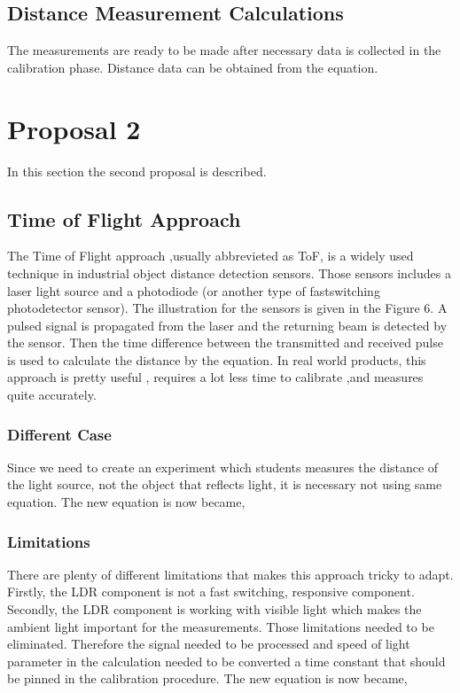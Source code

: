 \documentclass[letterpaper,12pt]{article}
\begin{document}
\subsection{Distance Measurement Calculations}
The measurements are ready to be made after necessary data is collected in the calibration phase. Distance data can be obtained from the  equation.



\section{Proposal 2}
In this section the second proposal is described.
\subsection{Time of Flight Approach}
The Time of Flight approach ,usually abbrevieted as ToF, is a widely used technique in industrial object distance detection sensors. Those sensors includes a laser light source and a photodiode (or another type of fastswitching photodetector sensor). The illustration for the sensors is given in the Figure 6.
A pulsed signal is propagated from the laser and the returning beam is detected by the sensor. Then the time difference between the transmitted and received pulse is used to calculate the distance by the equation.
In real world products, this approach is pretty useful , requires a lot less time to calibrate ,and measures quite accurately.
\subsubsection{Different Case}
Since we need to create an experiment which students measures the distance of the light source, not the object that reflects light, it is necessary not using same equation. The new equation is now became,

\subsubsection{Limitations}
There are plenty of different limitations that makes this approach tricky to adapt. Firstly, the LDR component is not a fast switching, responsive component. Secondly, the LDR component is working with visible light which makes the ambient light important for the measurements. Those limitations needed to be eliminated. Therefore the signal needed to be processed and speed of light parameter in the calculation needed to be converted a time constant that should be pinned in the calibration procedure. The new equation is now became,
\end{document}
